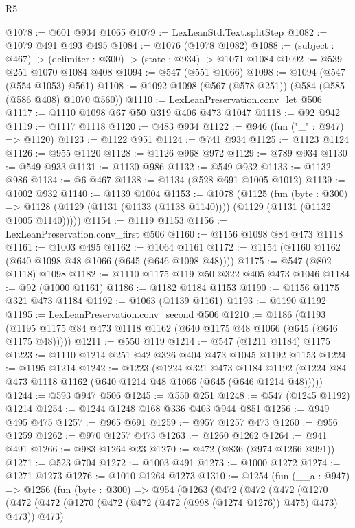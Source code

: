 \begin{lexlean}{R5}
\begin{coremodule}
@1078 := @601 @934 @1065
@1079 := LexLeanStd.Text.splitStep
@1082 := @1079 @491 @493 @495
@1084 := @1076 (@1078 @1082)
@1088 := (subject : @467) -> (delimiter : @300) -> (state : @934) -> @1071 @1084
@1092 := @539 @251 @1070 @1084 @408
@1094 := @547 (@551 @1066)
@1098 := @1094 (@547 (@554 @1053) @561)
@1108 := @1092 @1098 (@567 (@578 @251)) (@584 (@585 (@586 @408) @1070 @560))
@1110 := LexLeanPreservation.conv_let @506
@1117 := @1110 @1098 @67 @50 @319 @406 @473 @1047
@1118 := @92 @942
@1119 := @1117 @1118
@1120 := @483 @934
@1122 := @946 (fun ("_" : @947) => @1120)
@1123 := @1122 @951
@1124 := @741 @934
@1125 := @1123 @1124
@1126 := @955 @1120
@1128 := @1126 @968 @972
@1129 := @789 @934
@1130 := @549 @933
@1131 := @1130 @986
@1132 := @549 @932
@1133 := @1132 @986
@1134 := @6 @467
@1138 := @1134 (@528 @691 @1005 @1012)
@1139 := @1002 @932
@1140 := @1139 @1004
@1153 := @1078
    (@1125
      (fun (byte : @300) =>
      @1128 (@1129 (@1131 (@1133 (@1138 @1140)))) (@1129 (@1131 (@1132 @1005 @1140)))))
@1154 := @1119 @1153
@1156 := LexLeanPreservation.conv_first @506
@1160 := @1156 @1098 @84 @473 @1118
@1161 := @1003 @495
@1162 := @1064 @1161
@1172 := @1154 (@1160 @1162 (@640 @1098 @48 @1066 (@645 (@646 @1098 @48))))
@1175 := @547 (@802 @1118) @1098
@1182 := @1110 @1175 @119 @50 @322 @405 @473 @1046
@1184 := @92 (@1000 @1161)
@1186 := @1182 @1184 @1153
@1190 := @1156 @1175 @321 @473 @1184
@1192 := @1063 (@1139 @1161)
@1193 := @1190 @1192
@1195 := LexLeanPreservation.conv_second @506
@1210 := @1186
    (@1193 (@1195 @1175 @84 @473 @1118 @1162 (@640 @1175 @48 @1066 (@645 (@646 @1175 @48)))))
@1211 := @550 @119
@1214 := @547 (@1211 @1184) @1175
@1223 := @1110 @1214 @251 @42 @326 @404 @473 @1045 @1192 @1153
@1224 := @1195 @1214
@1242 := @1223
    (@1224
      @321
      @473
      @1184
      @1192
      (@1224 @84 @473 @1118 @1162 (@640 @1214 @48 @1066 (@645 (@646 @1214 @48)))))
@1244 := @593 @947 @506
@1245 := @550 @251
@1248 := @547 (@1245 @1192) @1214
@1254 := @1244 @1248 @168 @336 @403 @944 @851
@1256 := @949 @495 @475
@1257 := @965 @691
@1259 := @957 @1257 @473
@1260 := @956 @1259
@1262 := @970 @1257 @473
@1263 := @1260 @1262
@1264 := @941 @491
@1266 := @983 @1264 @23
@1270 := @472 (@836 (@974 @1266 @991))
@1271 := @523 @704
@1272 := @1003 @491
@1273 := @1000 @1272
@1274 := @1271 @1273
@1276 := @1010 @1264 @1273
@1310 := @1254
    (fun (__a : @947) =>
    @1256
      (fun (byte : @300) =>
      @954
        (@1263
          (@472
            (@472
              (@472
                (@1270
                  (@472
                    (@472 (@1270 (@472 (@472 (@472 (@998 (@1274 @1276)) @475) @473) @473)) @473)

\end{coremodule}
\end{lexlean}
